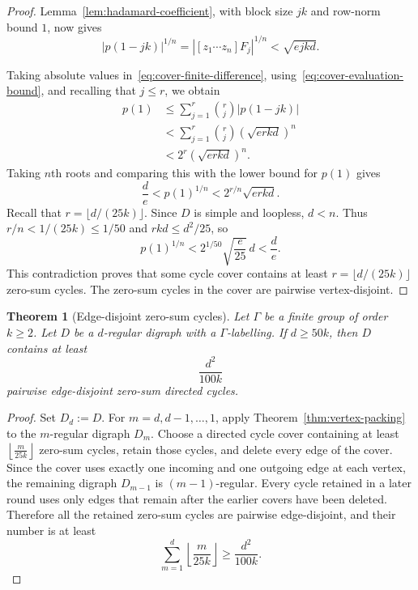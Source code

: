 \documentclass[11pt]{amsart}
\newtheorem{theorem}{Theorem}[section]
\theoremstyle{remark}
\begin{document}
\begin{proof}
Lemma~\ref{lem:hadamard-coefficient}, with block size $jk$ and
row-norm bound $1$, now gives
\begin{equation}\label{eq:cover-evaluation-bound}
  |p(1-jk)|^{1/n}
  =\left|[z_1\cdots z_n]F_j\right|^{1/n}
  <\sqrt{ejkd}.
\end{equation}

Taking absolute values in~\eqref{eq:cover-finite-difference},
using~\eqref{eq:cover-evaluation-bound}, and recalling that $j\le r$, we
obtain
\[
\begin{aligned}
  p(1)
  &\le
  \sum_{j=1}^r\binom rj|p(1-jk)|\\
  &<
  \sum_{j=1}^r\binom rj
  \left(\sqrt{erkd}\right)^n\\
  &<
  2^r\left(\sqrt{erkd}\right)^n.
\end{aligned}
\]
Taking $n$th roots and comparing this with the lower bound for $p(1)$
gives
\[
  \frac de
  <p(1)^{1/n}
  <2^{r/n}\sqrt{erkd}.
\]
Recall that $r=\lfloor d/(25k)\rfloor$.  Since $D$ is simple and
loopless, $d<n$.  Thus $r/n<1/(25k)\le1/50$ and $rkd\le d^2/25$, so
\[
  p(1)^{1/n}
  <2^{1/50}\sqrt{\frac e{25}}\,d
  <\frac de.
\]
This contradiction proves that some cycle cover contains at least
$r=\lfloor d/(25k)\rfloor$ zero-sum cycles.
The zero-sum cycles in the cover are pairwise vertex-disjoint.
\end{proof}

\begin{theorem}[Edge-disjoint zero-sum cycles]\label{thm:packing}
Let $\Gamma$ be a finite group of order $k\ge2$.  Let $D$ be a
$d$-regular digraph with a $\Gamma$-labelling.  If $d\ge50k$, then $D$
contains at least
\[
  \frac{d^2}{100k}
\]
pairwise edge-disjoint zero-sum directed cycles.
\end{theorem}

\begin{proof}
Set $D_d:=D$.  For $m=d,d-1,\ldots,1$, apply
Theorem~\ref{thm:vertex-packing} to the $m$-regular digraph $D_m$.
Choose a directed cycle cover containing at least
$\left\lfloor\frac{m}{25k}\right\rfloor$ zero-sum cycles, retain those
cycles, and delete every edge of the cover.  Since the cover uses
exactly one incoming and one outgoing
edge at each vertex, the remaining digraph $D_{m-1}$ is
$(m-1)$-regular.  Every cycle retained in a later round uses only
edges that remain after the earlier covers have been deleted.
Therefore all the retained zero-sum cycles are pairwise edge-disjoint,
and their number is at least
\[
  \sum_{m=1}^d\left\lfloor\frac{m}{25k}\right\rfloor
  \ge\frac{d^2}{100k}.
\]
\end{proof}
\end{document}
